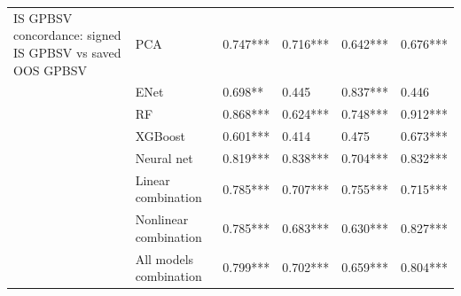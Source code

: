 \begin{tabular}{llllll}
IS GPBSV concordance: signed IS GPBSV vs saved OOS GPBSV & PCA &  0.747*** &  0.716*** &  0.642*** &  0.676*** \\
                                                         & ENet &   0.698** &     0.445 &  0.837*** &     0.446 \\
                                                         & RF &  0.868*** &  0.624*** &  0.748*** &  0.912*** \\
                                                         & XGBoost &  0.601*** &     0.414 &     0.475 &  0.673*** \\
                                                         & Neural net &  0.819*** &  0.838*** &  0.704*** &  0.832*** \\
                                                         & Linear combination &  0.785*** &  0.707*** &  0.755*** &  0.715*** \\
                                                         & Nonlinear combination &  0.785*** &  0.683*** &  0.630*** &  0.827*** \\
                                                         & All models combination &  0.799*** &  0.702*** &  0.659*** &  0.804*** \\
\bottomrule
\end{tabular}
